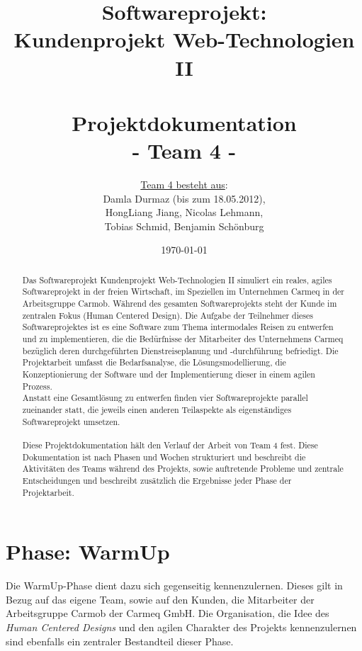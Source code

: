 \documentclass{article}
\title{Softwareprojekt:\\Kundenprojekt Web-Technologien II\\~\\Projektdokumentation\\ \small{- Team 4 -}}
\author{\underline{Team 4 besteht aus}:\\Damla Durmaz (bis zum 18.05.2012),\\HongLiang Jiang, Nicolas Lehmann,\\Tobias Schmid, Benjamin Sch\"onburg }
\date{\today}
\begin{document}
\renewcommand\abstractname{Worum geht es in diesem Softwareprojekt?}
\maketitle


\begin{abstract}
{\huge D}as Softwareprojekt Kundenprojekt Web-Technologien II simuliert ein reales, agiles Softwareprojekt in der freien Wirtschaft, im Speziellen im Unternehmen Carmeq in der Arbeitsgruppe Carmob. W\"ahrend des gesamten Softwareprojekts steht der Kunde im zentralen Fokus (Human Centered Design). Die Aufgabe der Teilnehmer dieses Softwareprojektes ist es eine Software zum Thema intermodales Reisen zu entwerfen und zu implementieren, die die Bed\"urfnisse der Mitarbeiter des Unternehmens Carmeq bez\"uglich deren durchgef\"uhrten Dienstreiseplanung und -durchf\"uhrung befriedigt. Die Projektarbeit umfasst die Bedarfsanalyse, die L\"osungsmodellierung, die Konzeptionierung der Software und der Implementierung dieser in einem agilen Prozess.\\
Anstatt eine Gesamtl\"osung zu entwerfen finden vier Softwareprojekte parallel zueinander statt, die jeweils einen anderen Teilaspekte als eigenst\"andiges Softwareprojekt umsetzen.\\
\\
Diese Projektdokumentation h\"alt den Verlauf der Arbeit von Team 4 fest. Diese Dokumentation ist nach Phasen und Wochen strukturiert und beschreibt die Aktivit\"aten des Teams w\"ahrend des Projekts, sowie auftretende Probleme und zentrale Entscheidungen und beschreibt zus\"atzlich die Ergebnisse jeder Phase der Projektarbeit.
\end{abstract}



\newpage
\tableofcontents
\newpage



\section{Phase: WarmUp}

Die WarmUp-Phase dient dazu sich gegenseitig kennenzulernen. Dieses gilt in Bezug auf das eigene Team, sowie auf den Kunden, die Mitarbeiter der Arbeitsgruppe Carmob der Carmeq GmbH. Die Organisation, die Idee des \textit{Human Centered Designs} und den agilen Charakter des Projekts kennenzulernen sind ebenfalls ein zentraler Bestandteil dieser Phase.
\end{document}
